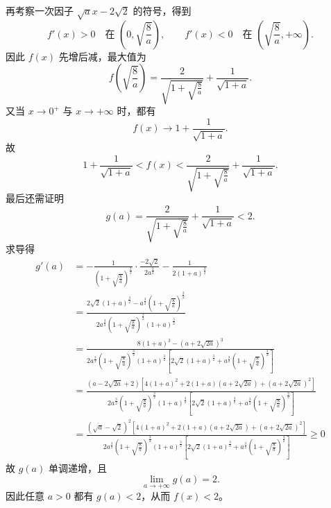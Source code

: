 \begin{solution}
再考察一次因子 $\sqrt{a}x-2\sqrt2$ 的符号，得到
\[
f'(x)>0 \quad \text{在 } \left(0,\sqrt{\frac{8}{a}}\right),
\qquad
f'(x)<0 \quad \text{在 } \left(\sqrt{\frac{8}{a}},+\infty\right).
\]
因此 $f(x)$ 先增后减，最大值为
\[
f\!\left(\sqrt{\frac{8}{a}}\right)=\frac{2}{\sqrt{1+\sqrt{\frac{8}{a}}}}+\frac{1}{\sqrt{1+a}}.
\]
又当 $x\to 0^+$ 与 $x\to +\infty$ 时，都有
\[
f(x)\to 1+\frac{1}{\sqrt{1+a}}.
\]
故
\[
1+\frac{1}{\sqrt{1+a}}<f(x)<\frac{2}{\sqrt{1+\sqrt{\frac{8}{a}}}}+\frac{1}{\sqrt{1+a}}.
\]
最后还需证明
\[
g(a)=\frac{2}{\sqrt{1+\sqrt{\frac{8}{a}}}}+\frac{1}{\sqrt{1+a}}<2.
\]
求导得
\begin{align*}g'(a)&=-\frac{1}{\left(1+\sqrt{\frac{8}{a}}\right)^{\frac{3}{2}}}\cdot\frac{-2\sqrt2}{2a^{\frac{3}{2}}}-\frac{1}{2(1+a)^{\frac{3}{2}}}\\&=\frac{2\sqrt{2}(1+a)^{\frac{3}{2}}-a^{\frac{3}{2}}\left(1+\sqrt{\frac{8}{a}}\right)^{\frac{3}{2}}}{2a^{\frac{3}{2}}\left(1+\sqrt{\frac{8}{a}}\right)^{\frac{3}{2}}(1+a)^{\frac{3}{2}}}\\&=\frac{8(1+a)^3-\left(a+2\sqrt{2a}\right)^3}{2a^{\frac{3}{2}}\left(1+\sqrt{\frac{8}{a}}\right)^{\frac{3}{2}}(1+a)^{\frac{3}{2}}\left[2\sqrt{2}(1+a)^{\frac{3}{2}}+a^{\frac{3}{2}}\left(1+\sqrt{\frac{8}{a}}\right)^{\frac{3}{2}}\right]}\\&=\frac{(a-2\sqrt{2a}+2)\left[4(1+a)^2+2(1+a)(a+2\sqrt{2a})+(a+2\sqrt{2a})^2\right]}{2a^{\frac{3}{2}}\left(1+\sqrt{\frac{8}{a}}\right)^{\frac{3}{2}}(1+a)^{\frac{3}{2}}\left[2\sqrt{2}(1+a)^{\frac{3}{2}}+a^{\frac{3}{2}}\left(1+\sqrt{\frac{8}{a}}\right)^{\frac{3}{2}}\right]}\\&=\frac{(\sqrt{a}-\sqrt{2})^2\left[4(1+a)^2+2(1+a)(a+2\sqrt{2a})+(a+2\sqrt{2a})^2\right]}{2a^{\frac{3}{2}}\left(1+\sqrt{\frac{8}{a}}\right)^{\frac{3}{2}}(1+a)^{\frac{3}{2}}\left[2\sqrt{2}(1+a)^{\frac{3}{2}}+a^{\frac{3}{2}}\left(1+\sqrt{\frac{8}{a}}\right)^{\frac{3}{2}}\right]}\geq0\end{align*}
故 $g(a)$ 单调递增，且
\[
\lim_{a\to +\infty} g(a)=2.
\]
因此任意 $a>0$ 都有 $g(a)<2$，从而 $f(x)<2$。
\end{solution}

\newpage
